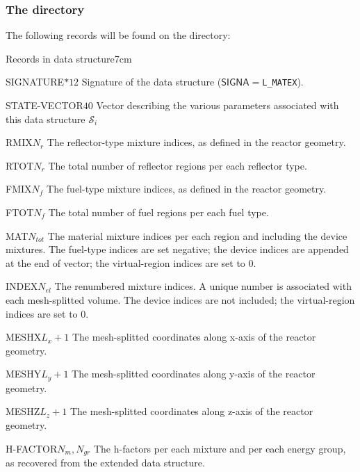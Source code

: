 \subsubsection{The  directory}\label{sect:matexdir}

\noindent
The following records will be found on the  directory:

\begin{DescriptionEnregistrement}{Records in  data structure}{7cm} 

\CharEnr
 {SIGNATURE}{$*12$}
 {Signature of the  data structure ($\mathsf{SIGNA}=${\tt L\_MATEX}).}

\IntEnr
 {STATE-VECTOR}{$40$}
 {Vector describing the various parameters associated with this data structure $\mathcal{S}_i$}

\IntEnr
 {RMIX}{$N_r$}
 {The reflector-type mixture indices, as defined in the reactor geometry.}

\IntEnr
 {RTOT}{$N_r$}
 {The total number of reflector regions per each reflector type.}

\IntEnr
 {FMIX}{$N_f$}
 {The fuel-type mixture indices, as defined in the reactor geometry.}

\IntEnr
 {FTOT}{$N_f$}
 {The total number of fuel regions per each fuel type.}

\IntEnr
 {MAT}{$N_{tot}$}
 {The material mixture indices per each region and including the device
  mixtures. The fuel-type indices are set negative; the device indices are
  appended at the end of vector; the virtual-region indices are set to 0.}

\IntEnr
 {INDEX}{$N_{el}$}
 {The renumbered mixture indices. A unique number is associated
  with each mesh-splitted volume. The device indices are not included;
  the virtual-region indices are set to 0.}

\RealEnr
 {MESHX}{$L_x+1$}{}
 {The mesh-splitted coordinates along x-axis of the reactor geometry.}

\RealEnr
 {MESHY}{$L_y+1$}{}
 {The mesh-splitted coordinates along y-axis of the reactor geometry.}

\RealEnr
 {MESHZ}{$L_z+1$}{}
 {The mesh-splitted coordinates along z-axis of the reactor geometry.}

\RealEnr
 {H-FACTOR}{$N_m, N_{gr}$}{}
 {The h-factors per each mixture and per each energy group,
  as recovered from the extended  data structure.}

\end{DescriptionEnregistrement}
\clearpage
